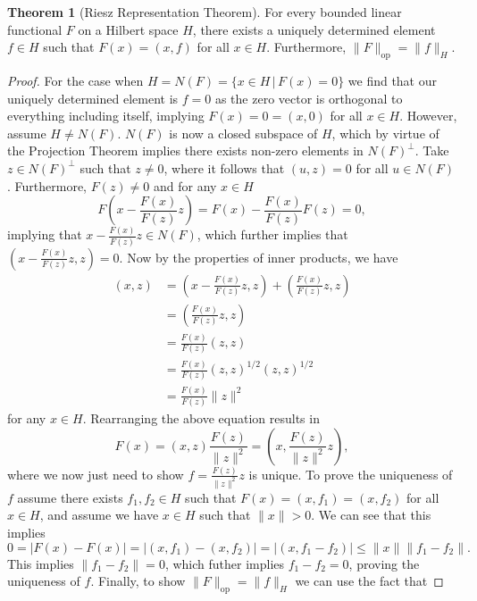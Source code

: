 \documentclass[11pt]{article}
\theoremstyle{definition}
\newtheorem*{theorem}{Theorem}
\begin{document}
\begin{theorem}[Riesz Representation Theorem]
	For every bounded linear functional $F$ on a Hilbert space $H$, there exists a uniquely determined element $f \in H$
	such that $F(x) = (x,f)$ for all $x \in H$. Furthermore, $\|F\|_{\text{op}} = \|f\|_H$.
\end{theorem}
\begin{proof}
	For the case when $H = N(F) = \{x \in H \, | \, F(x) = 0\}$ we find that our uniquely determined element is $f=0$ as the zero vector is
	orthogonal to everything including itself, implying $F(x) = 0 = (x,0)$ for all $x \in H$. However, assume $H \not= N(F)$.
	$N(F)$ is now a closed subspace of $H$, which by virtue of the Projection Theorem implies there exists non-zero elements in $N(F)^{\bot}$.
	Take $z \in N(F)^{\bot}$ such that $z \not= 0$, where it follows that $(u,z) = 0$ for all $u \in N(F)$. Furthermore, $F(z) \not= 0$ and for any $x \in H$
	\[F\left(x - \frac{F(x)}{F(z)}z\right) = F(x) - \frac{F(x)}{F(z)}F(z) = 0,\]
	implying that $x - \frac{F(x)}{F(z)}z \in N(F)$, which further implies that $\left(x - \frac{F(x)}{F(z)}z, z\right) = 0$.
	Now by the properties of inner products, we have
	\begin{equation*}
		\begin{aligned}
			(x,z) &= \left(x - \frac{F(x)}{F(z)}z,z\right) + \left(\frac{F(x)}{F(z)}z,z\right) \\
			      &= \left(\frac{F(x)}{F(z)}z,z\right) \\
			      &= \frac{F(x)}{F(z)}(z,z) \\
			      &= \frac{F(x)}{F(z)}(z,z)^{1/2}(z,z)^{1/2} \\
			      &= \frac{F(x)}{F(z)}\|z\|^2
		\end{aligned}
	\end{equation*}
	for any $x \in H$. Rearranging the above equation results in 
	\[F(x) = (x,z)\frac{F(z)}{\|z\|^2} = \left(x,\frac{F(z)}{\|z\|^2}z\right),\]
	where we now just need to show $f = \frac{F(z)}{\|z\|^2}z$ is unique.
	To prove the uniqueness of $f$ assume there exists $f_1,f_2 \in H$ such that $F(x) = (x,f_1) = (x,f_2)$ for all $x \in H$,
	and assume we have $x \in H$ such that $\|x\| > 0$. We can see that this implies
	\begin{equation*}
		0 = |F(x) - F(x)| = |(x,f_1) - (x,f_2)| = |(x,f_1-f_2)| \leq \|x\|\|f_1 - f_2\|.
	\end{equation*}
	This implies $\|f_1-f_2\| = 0$, which futher implies $f_1-f_2= 0$, proving the uniqueness of $f$.
	Finally, to show $\|F\|_{\text{op}} = \|f\|_H$ we can use the fact that

\end{proof}
\end{document}
